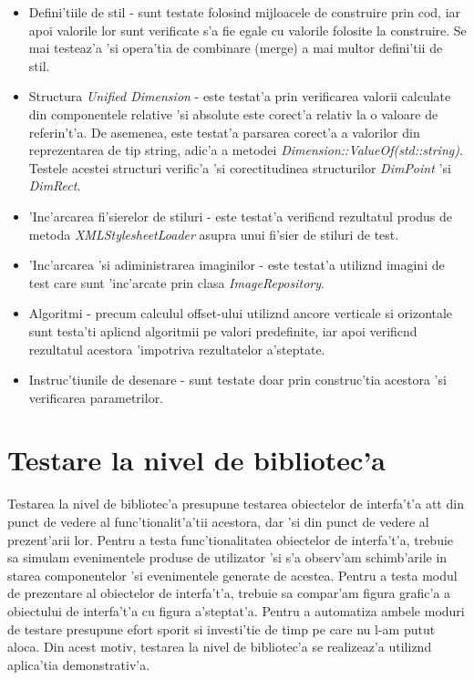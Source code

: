 \begin{itemize}
\item Defini'tiile de stil - sunt testate folosind mijloacele de construire prin cod, iar apoi valorile lor sunt verificate s'a fie egale cu valorile folosite la construire. Se mai testeaz'a 'si opera'tia de combinare (merge) a mai multor defini'tii de stil.
\item Structura \emph{Unified Dimension} - este testat'a prin verificarea valorii calculate din componentele relative 'si absolute este corect'a relativ la o valoare de referin't'a. De asemenea, este testat'a parsarea corect'a a valorilor din reprezentarea de tip string, adic'a a metodei \emph{Dimension::ValueOf(std::string)}. Testele acestei structuri verific'a 'si corectitudinea structurilor \emph{DimPoint} 'si \emph{DimRect}.
\item 'Inc'arcarea fi'sierelor de stiluri - este testat'a verific{\ia}nd rezultatul produs de metoda \emph{XMLStylesheetLoader} asupra unui fi'sier de stiluri de test.
\item 'Inc'arcarea 'si adiministrarea imaginilor - este testat'a utiliz{\ia}nd imagini de test care sunt 'inc'arcate prin clasa \emph{ImageRepository}.
\item Algoritmi - precum calculul offset-ului utiliz{\ia}nd ancore verticale si orizontale sunt testa'ti aplic{\ia}nd algoritmii pe valori predefinite, iar apoi verific{\ia}nd rezultatul acestora 'impotriva rezultatelor a'steptate.
\item Instruc'tiunile de desenare - sunt testate doar prin construc'tia acestora 'si verificarea parametrilor.
\end{itemize}

\section{Testare la nivel de bibliotec'a}

Testarea la nivel de bibliotec'a presupune testarea obiectelor de interfa't'a at{\ia}t din punct de vedere al func'tionalit'a'tii acestora, dar 'si din punct de vedere al prezent'arii lor. Pentru a testa func'tionalitatea obiectelor de interfa't'a, trebuie sa simulam evenimentele produse de utilizator 'si s'a observ'am schimb'arile in starea componentelor 'si evenimentele generate de acestea. Pentru a testa modul de prezentare al obiectelor de interfa't'a, trebuie sa compar'am figura grafic'a a obiectului de interfa't'a cu figura a'steptat'a. Pentru a automatiza ambele moduri de testare presupune efort sporit si investi'tie de timp pe care nu l-am putut aloca. Din acest motiv, testarea la nivel de bibliotec'a se realizeaz'a utiliz{\ia}nd aplica'tia demonstrativ'a.

